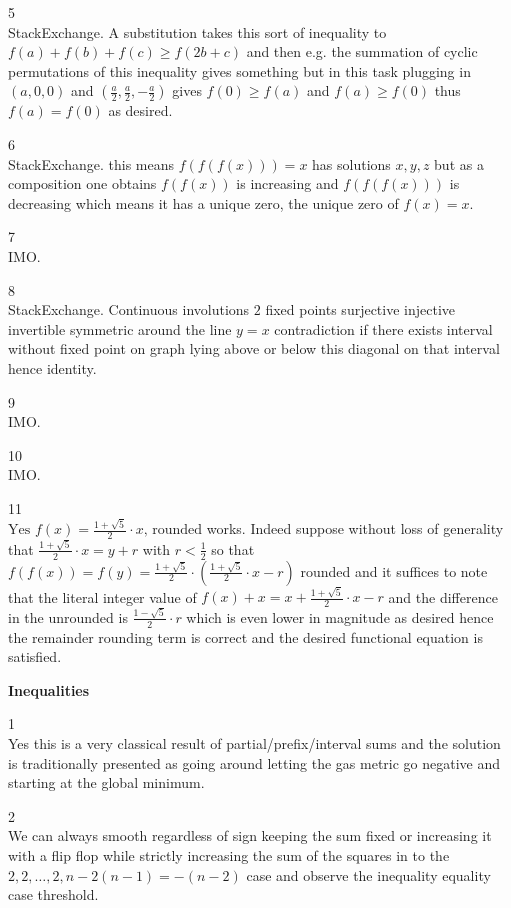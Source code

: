 5 \\
StackExchange. A substitution takes this sort of inequality to $f(a)+f(b)+f(c) \ge f(2b+c)$ and then e.g. the summation of cyclic permutations of this inequality gives something but in this task plugging in $(a,0,0)$ and $\left(\frac{a}{2},\frac{a}{2},-\frac{a}{2} \right)$ gives $f(0)\ge f(a)$ and $f(a)\ge f(0)$ thus $f(a)=f(0)$ as desired.

6 \\
StackExchange. this means $f(f(f(x)))=x$ has solutions $x,y,z$ but as a composition one obtains $f(f(x))$ is increasing and $f(f(f(x)))$ is decreasing which means it has a unique zero, the unique zero of $f(x)=x$.

7 \\
IMO.

8 \\
StackExchange. Continuous involutions $2$ fixed points surjective injective invertible symmetric around the line $y=x$ contradiction if there exists interval without fixed point on graph lying above or below this diagonal on that interval hence identity.

9 \\
IMO.

10 \\
IMO.

11 \\
$\boxed{\text{Yes }f(x)=\frac{1+\sqrt{5}}{2} \cdot x\text{, rounded}}$ works. Indeed suppose without loss of generality that $\frac{1+\sqrt{5}}{2} \cdot x=y+r$ with $r<\frac{1}{2}$ so that $f(f(x))=f(y)=\frac{1+\sqrt{5}}{2} \cdot \left(\frac{1+\sqrt{5}}{2} \cdot x-r \right)$ rounded and it suffices to note that the literal integer value of $f(x)+x=x+\frac{1+\sqrt{5}}{2} \cdot x -r$ and the difference in the unrounded is $\frac{1-\sqrt{5}}{2} \cdot r$ which is even lower in magnitude as desired hence the remainder rounding term is correct and the desired functional equation is satisfied.

\newpage

\textbf{Inequalities}

1 \\
Yes this is a very classical result of partial/prefix/interval sums and the solution is traditionally presented as going around letting the gas metric go negative and starting at the global minimum.

2 \\
We can always smooth regardless of sign keeping the sum fixed or increasing it with a flip flop while strictly increasing the sum of the squares in to the $2,2,\dots,2,n-2(n-1)=-(n-2)$ case and observe the inequality equality case threshold.

